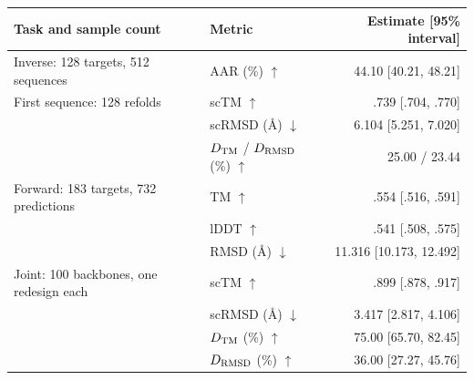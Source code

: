 \par\addvspace{6pt}\noindent
    \begin{minipage}{\linewidth}
        \makeatletter{}\makeatother
        \centering\small
        \caption{Task results under the reported sampling configuration; brackets give 95\% intervals. Joint rows use ProteinMPNN redesign.}
        \label{tab:protein:headline}
        \setlength{\tabcolsep}{4pt}
        \begin{tabular}{@{}llr@{}}
        \toprule
        Task and sample count & Metric & Estimate [95\% interval] \\
        \midrule
        Inverse: 128 targets, 512 sequences & AAR (\%) $\uparrow$ & 44.10 [40.21, 48.21] \\
        \quad First sequence: 128 refolds & scTM $\uparrow$ & .739 [.704, .770] \\
        & scRMSD (\AA) $\downarrow$ & 6.104 [5.251, 7.020] \\
        & $D_{\rm TM}$ / $D_{\rm RMSD}$ (\%) $\uparrow$ & 25.00 / 23.44 \\
        Forward: 183 targets, 732 predictions & TM $\uparrow$ & .554 [.516, .591] \\
        & lDDT $\uparrow$ & .541 [.508, .575] \\
        & RMSD (\AA) $\downarrow$ & 11.316 [10.173, 12.492] \\
        Joint: 100 backbones, one redesign each & scTM $\uparrow$ & .899 [.878, .917] \\
        & scRMSD (\AA) $\downarrow$ & 3.417 [2.817, 4.106] \\
        & $D_{\rm TM}$ (\%) $\uparrow$ & 75.00 [65.70, 82.45] \\
        & $D_{\rm RMSD}$ (\%) $\uparrow$ & 36.00 [27.27, 45.76] \\
        \bottomrule
        \end{tabular}
    \end{minipage}\par\addvspace{6pt}


